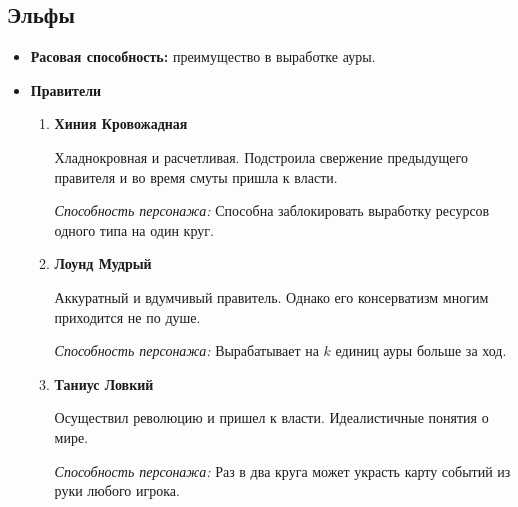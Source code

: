 \documentclass[a4paper,12pt,landscape]{article}
\begin{document}
    \subsection{Эльфы}
    \begin{itemize}
      \item \textbf{Расовая способность:} преимущество в выработке ауры.
      \item \textbf{Правители} 
        \begin{enumerate}
          \item \textbf{Хиния Кровожадная}
          
          Хладнокровная и расчетливая. Подстроила свержение предыдущего правителя и во время смуты пришла к власти.

          \textit{Способность персонажа:} Способна заблокировать выработку ресурсов одного типа на один круг.
          
          \item \textbf{Лоунд Мудрый}
          
          Аккуратный и вдумчивый правитель. Однако его консерватизм многим приходится не по душе.

          \textit{Способность персонажа:} Вырабатывает на $k$ единиц ауры больше за ход.
          
          \item \textbf{Таниус Ловкий}
          
          Осуществил революцию и пришел к власти. Идеалистичные понятия о мире.

          \textit{Способность персонажа:} Раз в два круга может украсть карту событий из руки любого игрока.
        \end{enumerate}
    \end{itemize}    
    
\end{document}
